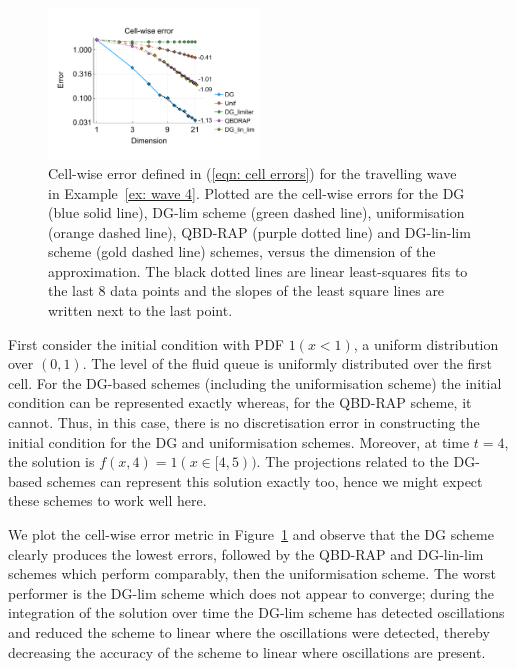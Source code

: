 \begin{example}\label{ex: wave 4}
	\begin{figure}[h]
		\centering
		\includegraphics[width=0.5\textwidth,trim={0.75cm 0.8cm 0.25cm 1.25cm},clip]{chapter6/figs/wave/fun4/L1_cell_probs.pdf}
		\caption{Cell-wise error defined in (\ref{eqn: cell errors}) for the travelling wave in Example~\ref{ex: wave 4}. Plotted are the cell-wise errors for the DG (blue solid line), DG-lim scheme (green dashed line), uniformisation (orange dashed line), QBD-RAP (purple dotted line) and DG-lin-lim scheme (gold dashed line) schemes, versus the dimension of the approximation. The black dotted lines are linear least-squares fits to the last 8 data points and the slopes of the least square lines are written next to the last point.}
		\label{fig: fun 4 wave cp} 
	\end{figure}
First consider the initial condition with PDF \(1(x<1)\), a uniform distribution over \((0,1)\). The level of the fluid queue is uniformly distributed over the first cell. For the DG-based schemes (including the uniformisation scheme) the initial condition can be represented exactly whereas, for the QBD-RAP scheme, it cannot. Thus, in this case, there is no discretisation error in constructing the initial condition for the DG and uniformisation schemes. Moreover, at time \(t=4\), the solution is \(f(x,4)=1(x\in[4,5))\). The projections related to the DG-based schemes can represent this solution exactly too, hence we might expect these schemes to work well here. 

We plot the cell-wise error metric in Figure~\ref{fig: fun 4 wave cp} and observe that the DG scheme clearly produces the lowest errors, followed by the QBD-RAP and DG-lin-lim schemes which perform comparably, then the uniformisation scheme. The worst performer is the DG-lim scheme which does not appear to converge; during the integration of the solution over time the DG-lim scheme has detected oscillations and reduced the scheme to linear where the oscillations were detected, thereby decreasing the accuracy of the scheme to linear where oscillations are present. 


\end{example}
